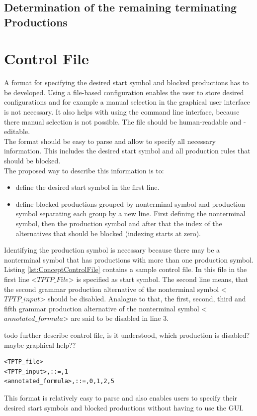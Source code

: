 \subsection{Determination of the remaining terminating Productions}

\section{Control File}\label{sec:ConceptControlFile}
A format for specifying the desired start symbol and blocked productions has to be developed.
Using a file-based configuration enables the user to store desired configurations and for example a manual selection in the graphical user interface is not necessary.
It also helps with using the command line interface, because there manual selection is not possible.
The file should be human-readable and -editable.\\
The format should be easy to parse and allow to specify all necessary information.
This includes the desired start symbol and all production rules that should be blocked.\\
The proposed way to describe this information is to:

\begin{itemize}%
	\item define the desired start symbol in the first line.
	\item define blocked productions grouped by nonterminal symbol and production symbol separating each group by a new line.
	First defining the nonterminal symbol, then the production symbol and after that the index of the alternatives that should be blocked (indexing starts at zero). 
\end{itemize}
\label{itemize:ConceptControlFile}
Identifying the production symbol is necessary because there may be a nonterminal symbol that has productions with more than one production symbol.\\
Listing \ref{lst:ConceptControlFile} contains a sample control file. In this file in the first line <$TPTP\_File$> is specified as start symbol.
The second line means, that the second grammar production alternative of the nonterminal symbol <$TPTP\_input$> should be disabled.
Analogue to that, the first, second, third and fifth grammar production alternative of the nonterminal symbol <$annotated\_formula$> are said to be disabled in line 3.

todo further describe control file, is it understood, which production is disabled? maybe graphical help??
\begin{lstlisting}[caption= Example of a control file,label= lst:ConceptControlFile]
<TPTP_file>
<TPTP_input>,::=,1
<annotated_formula>,::=,0,1,2,5
\end{lstlisting}
This format is relatively easy to parse and also enables users to specify their desired start symbols and blocked productions without having to use the GUI.

